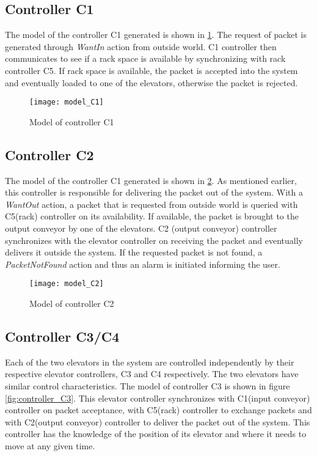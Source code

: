 \subsection*{Controller C1}

The model of the controller C1 generated is shown in \ref{fig:controller_C1}. The request of packet is generated through \textit{WantIn} action from outside world. C1 controller then communicates to see if a rack space is available by synchronizing with rack controller C5. If rack space is available, the packet is accepted into the system and eventually loaded to one of the elevators, otherwise the packet is rejected.

\begin{figure}[h]
\center
\texttt{[image: model\_C1]}
\caption{Model of controller C1}
\label{fig:controller_C1}
\end{figure}

\subsection*{Controller C2}
The model of the controller C1 generated is shown in \ref{fig:controller_C2}. As mentioned earlier, this controller is responsible for delivering the packet out of the system. With a \textit{WantOut} action, a packet that is requested from outside world is queried with C5(rack) controller on its availability. If available, the packet is brought to the output conveyor by one of the elevators. C2 (output conveyor) controller synchronizes with the elevator controller on receiving the packet and eventually delivers it outside the system. If the requested packet is not found, a \textit{PacketNotFound} action and thus an alarm is initiated informing the user.

\begin{figure}[ht]
\center
\texttt{[image: model\_C2]}
\caption{Model of controller C2}
\label{fig:controller_C2}
\end{figure}


\subsection*{Controller C3/C4}
Each of the two elevators in the system are controlled independently by their respective elevator controllers, C3 and C4 respectively. The two elevators have similar control characteristics. The model of controller C3 is shown in figure \ref{fig:controller_C3}. This elevator controller synchronizes with C1(input conveyor) controller on packet acceptance, with C5(rack) controller to exchange packets and with C2(output conveyor) controller to deliver the packet out of the system. This controller has the knowledge of the position of its elevator and where it needs to move at any given time.

